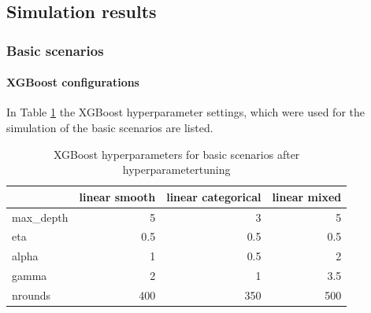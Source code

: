 \clearpage
\subsection{Simulation results}
\subsubsection{Basic scenarios}\label{app:basic_scenarios}

\paragraph{XGBoost configurations}
In Table \ref{tab:app_xgboost_config} the XGBoost hyperparameter settings, which were used for the simulation of the basic scenarios are listed.
\begin{table}[!htb]
    \centering
    \begin{tabular}{l|r|r|r}
    \hline
    & linear smooth & linear categorical & linear mixed \\
    \hline
    max\_depth & 5 & 3 & 5 \\
    eta & 0.5 & 0.5 & 0.5 \\
    alpha & 1 & 0.5 & 2 \\
    gamma & 2 & 1 & 3.5 \\
    nrounds & 400 & 350 & 500\\
    \hline
    \end{tabular}
    \caption{XGBoost hyperparameters for basic scenarios after hyperparametertuning}
    \label{tab:app_xgboost_config}
\end{table}


